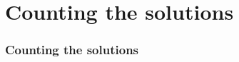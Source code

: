 \documentclass{beamer}
\theoremstyle{definition}
\newtheorem{teorema}{Teorema}
\begin{document}
\section{Counting the solutions}



\begin{frame}
\frametitle{Counting the solutions}
%
%
\end{frame}
\end{document}
